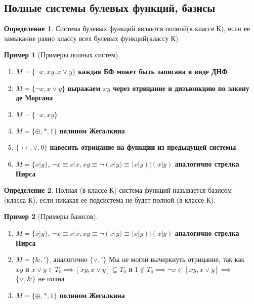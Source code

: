 \documentclass[a4paper]{article}
\theoremstyle{definition}
\newtheorem*{example}{Пример}
\newtheorem*{definition}{Определение}
\theoremstyle{remark}
\begin{document}
    \subsection{Полные системы булевых функций, базисы}
    \begin{definition}
        Система булевых функций является полной(в классе К), если ее замыкание равно классу всех булевых функций(классу К)
    \end{definition}
    \begin{example}[Примеры полных систем]
        \begin{enumerate}
            \item $M = \{\neg x, xy, x\vee y\}$ \textbf{каждая БФ может быть записана в виде ДНФ}
            \item $M = \{\neg x, x\vee y\}$ \textbf{выражаем $xy$ через отрицание и дизъюнкцию по закону де Моргана}
            \item $M = \{\neg x, xy\}$
            \item $M = \{\oplus, *, 1\}$ \textbf{полином Жегалкина}
            \item $\{\leftrightarrow, \vee, 0\}$ \textbf{навесить отрицание на функции из предыдущей системы}
            \item $M = \{x|y\}$, $\neg x \equiv x|x, xy\equiv \neg(x|y) \equiv (x|y)|(x|y)$ \textbf{аналогично стрелка Пирса}
        \end{enumerate}
    \end{example}
    \begin{definition}
        Полная (в классе К) система функций называется базисом (класса К), если никакая ее подсистема не будет полной (в классе К).
    \end{definition}
    \begin{example}[Примеры базисов]
        \begin{enumerate}
            \item $M = \{x|y\}$, $\neg x \equiv x|x, xy\equiv \neg(x|y) \equiv (x|y)|(x|y)$ \textbf{аналогично стрелка Пирса}
            \item $M = \{\&, '\}$, аналогично $\{\vee, '\}$
            Мы не могли вычеркнуть отрицание, так как $xy$ и $x\vee y\in T_0\implies [xy, x\vee y]\subseteq T_0$
            и $1\notin T_0\implies \neg x \in [xy, x\vee y]\implies$ $\{\vee, \& \}$ не полна
            \item $M = \{\oplus, *, 1\}$ \textbf{полином Жегалкина}
        \end{enumerate}
    \end{example}
\end{document}
